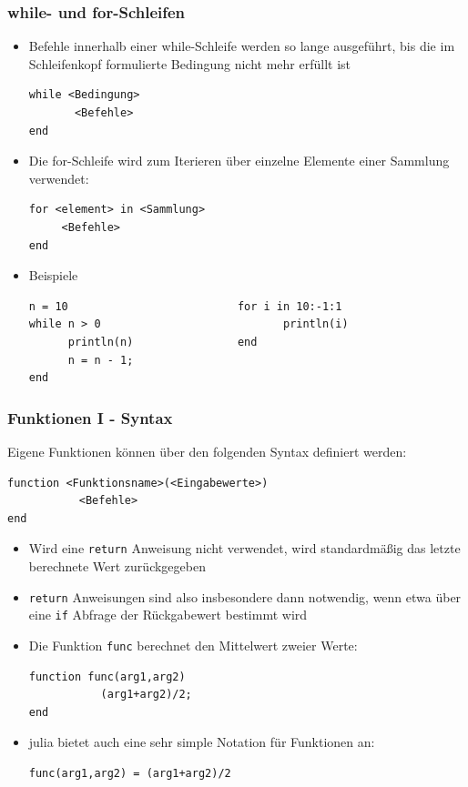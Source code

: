 \begin{frame}[fragile]
\frametitle{while- und for-Schleifen}
\begin{itemize}[<+->]
\item Befehle innerhalb einer while-Schleife werden so lange ausgeführt, bis die im Schleifenkopf formulierte Bedingung nicht mehr erfüllt ist
\begin{verbatim}
while <Bedingung>
       <Befehle>
end
\end{verbatim}
\item Die for-Schleife wird zum Iterieren über einzelne Elemente einer Sammlung verwendet:
\begin{verbatim}
for <element> in <Sammlung>
     <Befehle>
end
\end{verbatim}
\item Beispiele
\begin{verbatim}
n = 10                          for i in 10:-1:1
while n > 0                            println(i)
      println(n)                end
      n = n - 1;
end

\end{verbatim}
\end{itemize}
\end{frame}
\begin{frame}[fragile]
\frametitle{Funktionen I - Syntax}
Eigene Funktionen können über den folgenden Syntax definiert werden:
\begin{verbatim}
function <Funktionsname>(<Eingabewerte>)
           <Befehle>
end
\end{verbatim}\pause
\begin{itemize}[<+->]
\item Wird eine \verb+return+ Anweisung nicht verwendet, wird standardmäßig das letzte berechnete Wert zurückgegeben
\item \verb+return+ Anweisungen sind also insbesondere dann notwendig, wenn etwa über eine \verb+if+ Abfrage der Rückgabewert bestimmt wird
\item Die Funktion \verb+func+ berechnet den Mittelwert zweier Werte:
\begin{verbatim}
function func(arg1,arg2)
           (arg1+arg2)/2;
end
\end{verbatim}
\item julia bietet auch eine sehr simple Notation für Funktionen an:
\begin{verbatim}
func(arg1,arg2) = (arg1+arg2)/2
\end{verbatim}
\end{itemize}
\end{frame}

